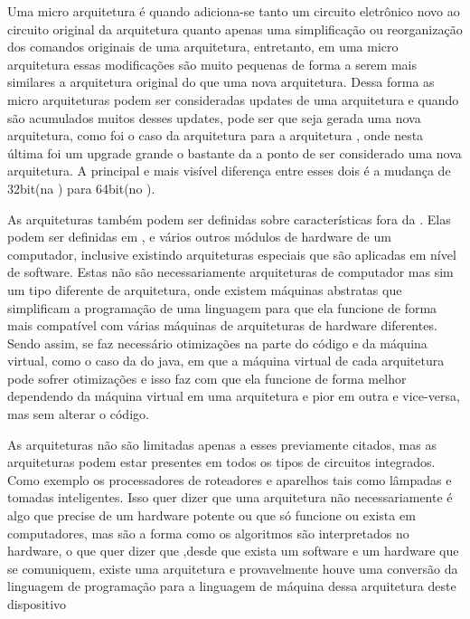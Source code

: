 \documentclass[
	12pt,				%
	openright,			%
	oneside,			%
	a4paper,			%
	english,			%
	french,				%
	spanish,			%
	brazil,				%
	]{abntex2}
\begin{document}
Uma micro arquitetura é quando adiciona-se tanto um circuito eletrônico novo ao circuito original da arquitetura quanto apenas uma simplificação ou reorganização dos comandos originais de uma arquitetura,
entretanto, em uma micro arquitetura essas modificações são muito pequenas de forma a serem mais similares a arquitetura original do que uma nova arquitetura.
Dessa forma as micro arquiteturas podem ser consideradas updates de uma arquitetura e quando são acumulados muitos desses updates, pode ser que seja gerada uma nova arquitetura,
como foi o caso da arquitetura  para a arquitetura , onde nesta última foi um upgrade grande o bastante da  a ponto de ser considerado uma nova arquitetura.
A principal e mais visível diferença entre esses dois é a mudança de 32bit(na ) para 64bit(no ).\newline

As arquiteturas também podem ser definidas sobre características fora da . Elas podem ser definidas em ,
 e vários outros módulos de hardware de um computador, inclusive existindo arquiteturas especiais que são aplicadas em nível de software.
Estas não são necessariamente arquiteturas de computador mas sim um tipo diferente de arquitetura,
onde existem máquinas abstratas que simplificam a programação de uma linguagem para que ela funcione de forma mais compatível com várias máquinas de arquiteturas de hardware diferentes.
Sendo assim, se faz necessário otimizações na parte do código e da máquina virtual, como o caso da  do java,
em que a máquina virtual de cada arquitetura pode sofrer otimizações e isso faz com que ela funcione de forma melhor dependendo da máquina virtual em uma arquitetura e pior em outra e vice-versa, mas sem alterar o código.\newline

As arquiteturas não são limitadas apenas a esses previamente citados, mas as arquiteturas podem estar presentes em todos os tipos de circuitos integrados.
Como exemplo os processadores de roteadores e aparelhos  tais como lâmpadas e tomadas inteligentes.
Isso quer dizer que uma arquitetura não necessariamente é algo que precise de um hardware potente ou que só funcione ou exista em computadores,
mas são a forma como os algoritmos são interpretados no hardware, o que quer dizer que ,desde que exista um software e um hardware que se comuniquem,
existe uma arquitetura e provavelmente houve uma conversão da linguagem de programação para a linguagem de máquina dessa arquitetura deste dispositivo\newline
\end{document}

